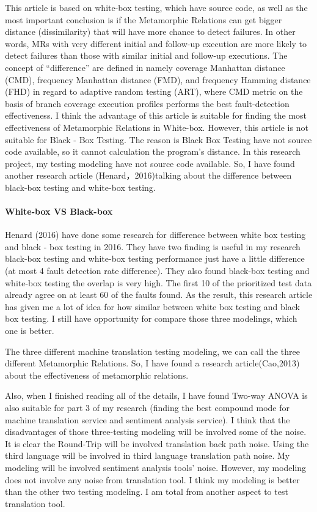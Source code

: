 \documentclass[conference]{IEEEtran}
\begin{document}
This article is based on white-box testing, which have source code, as well as the most important conclusion is if the Metamorphic Relations can get bigger distance (dissimilarity) that will have more chance to detect failures.  In other words, MRs with very different initial and follow-up execution are more likely to detect failures than those with similar initial and follow-up executions. The concept of “difference” are defined in namely coverage Manhattan distance (CMD), frequency Manhattan distance (FMD), and frequency Hamming distance (FHD) in regard to adaptive random testing (ART), where CMD metric on the basis of branch coverage execution profiles performs the best fault-detection effectiveness.
 I think the advantage of this article is suitable for finding the most effectiveness of Metamorphic Relations in White-box. However, this article is not suitable for Black - Box Testing. The reason is Black Box Testing have not source code available, so it cannot calculation the program’s distance. In this research project, my testing modeling have not source code available. So, I have found another research article (Henard，2016)talking about the difference between black-box testing and white-box testing.

\paragraph{White-box VS Black-box}
Henard (2016) have done some research for difference between white box testing
and black - box testing in 2016. They have two finding is useful in my research
black-box testing and white-box testing performance just have a little
difference (at most 4 fault detection rate difference). They also found
black-box testing and white-box testing the overlap is
very high. The first 10 of the prioritized test data
already agree on at least 60 of the faults found. As the
result, this research article has given me a lot of idea
for how similar between white box testing and black box
testing. I still have opportunity for compare those three
modelings, which one is better.




The three different machine translation testing modeling, we can call the three
different Metamorphic Relations. So, I have found a research article(Cao,2013)
about the effectiveness of metamorphic relations.

Also, when I finished reading all of the details, I have found Two-way ANOVA is also suitable for part 3 of my research (finding the best compound mode for machine translation service and sentiment analysis service).
I think that the disadvantages of those three-testing modeling will be involved some of the noise.
 It is clear the Round-Trip will be involved translation back path noise. Using the third language will be involved in third language translation path noise. My modeling will be involved sentiment analysis tools’ noise. However, my modeling does not involve any noise from translation tool. I think my modeling is better than the other two testing modeling. I am total from another aspect to test translation tool.
\end{document}
